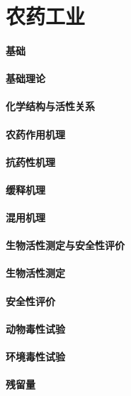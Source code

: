 \documentclass[UTF8]{../../ApplicationUniverse}
\begin{document}
\chapter{农药工业}
\subsubsection{基础}
    \subsubsection{基础理论}
        \subsubsection{化学结构与活性关系}
        \subsubsection{农药作用机理}
        \subsubsection{抗药性机理}
        \subsubsection{缓释机理}
        \subsubsection{混用机理}
    \subsubsection{生物活性测定与安全性评价}
        \subsubsection{生物活性测定}
        \subsubsection{安全性评价}
            \subsubsection{动物毒性试验}
            \subsubsection{环境毒性试验}
            \subsubsection{残留量}
\end{document}
